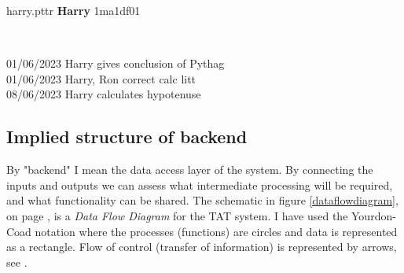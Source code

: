 \documentclass[10pt]{article}
\begin{document}
\begin{center}
\begin{tcolorbox}

harry.pttr \hfill \textbf{Harry} \hfill 1ma1df01

\

\small{
01/06/2023 Harry gives conclusion of Pythag \\
01/06/2023 Harry, Ron correct calc litt \\
08/06/2023 Harry calculates hypotenuse
}

\vspace{10mm}

\begin{center}
\end{center}

\end{tcolorbox}
\end{center}


\subsection{Implied structure of backend}

By "backend" I mean the data access layer of the system. By connecting the inputs and outputs we can assess what intermediate processing will be required, and what functionality can be shared. The schematic in figure \ref{dataflowdiagram}, on page \pageref{dataflowdiagram}, is a \emph{Data Flow Diagram} for the TAT system. I have used the Yourdon-Coad notation where the processes (functions) are circles and data is represented as a rectangle. Flow of control (transfer of information) is represented by arrows, see \cite{Coad91}.
\end{document}
